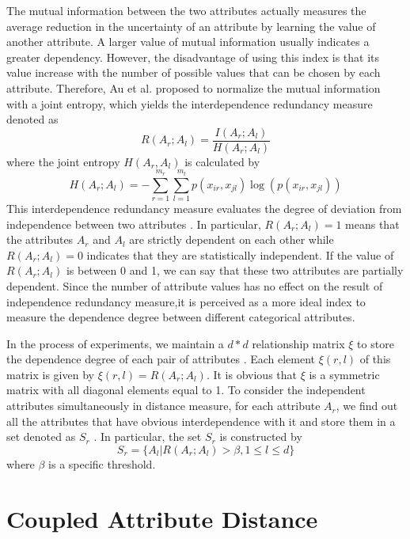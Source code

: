 \documentclass[review]{elsarticle}
\begin{document}
The mutual information between the two attributes actually measures the average reduction in the uncertainty of an attribute by learning the value of another attribute. A larger value of mutual information usually indicates a greater dependency. However, the disadvantage of using this index is that its value increase with the number of possible values that can be chosen by each attribute. Therefore, Au et al. \cite{WaiHoAu2005Grouping} proposed to normalize the mutual information with a joint entropy, which yields the interdependence redundancy measure denoted as
\begin{equation}
R(A_r;A_l) = \frac{I(A_r;A_l)}{H(A_r;A_l)}
\label{equ14}
\end{equation}
where the joint entropy $H(A_r,A_l)$ is calculated by
\begin{equation}
H(A_r;A_l) = - \sum_{r=1}^{m_r}\sum_{l=1}^{m_l}p(x_{ir},x_{jl})\log(p(x_{ir},x_{jl}))
\label{equ15}
\end{equation}
This interdependence redundancy measure evaluates the degree of deviation from independence between two attributes \cite{WaiHoAu2005Grouping}. In particular, $R(A_r;A_l) = 1$ means that the attributes $A_r$ and $A_l$ are strictly dependent on each other while $R(A_r;A_l) = 0$ indicates that they are statistically independent. If the value of $R(A_r;A_l)$ is between 0 and 1, we can say that these two attributes are partially dependent. Since the number of attribute values has no effect on the result of independence redundancy measure,it is perceived as a more ideal index to measure the dependence degree between different categorical attributes.

In the process of experiments, we maintain a $d*d$ relationship matrix $\xi$ to store the dependence degree of each pair of attributes \cite{JiaH2016NewMetric}. Each element $\xi(r,l)$ of this matrix is given by $\xi(r,l) = R(A_r;A_l)$. It is obvious that $\xi$ is a symmetric matrix with all diagonal elements equal to 1. To consider the independent attributes simultaneously in distance measure, for each attribute $A_r$, we find out all the attributes that have obvious interdependence with it and store them in a set denoted as $S_r$ \cite{JiaH2016NewMetric}. In particular, the set $S_r$ is constructed by
\begin{equation}
S_r = \{A_l|R(A_r;A_l) > \beta, 1 \leq l \leq d \}
\label{equ16}
\end{equation}
where $\beta$ is a specific threshold.

\section{Coupled Attribute Distance}
\end{document}
